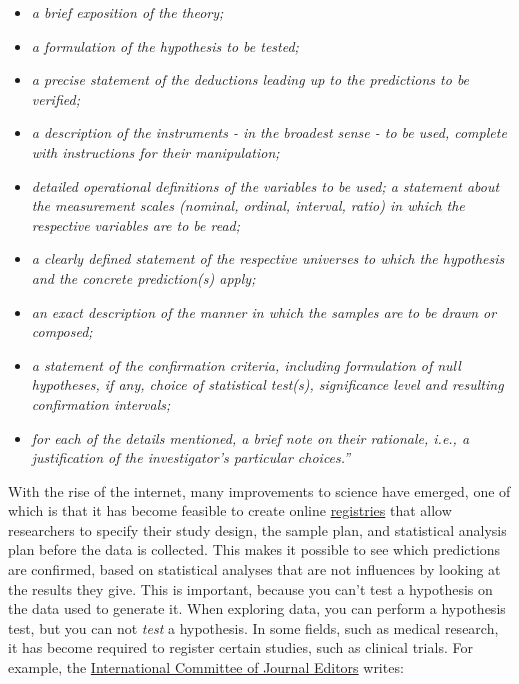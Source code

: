 \documentclass[
  oneside]{book}
\providecommand{\tightlist}{%
  \setlength{\itemsep}{0pt}\setlength{\parskip}{0pt}}
\begin{document}
\begin{itemize}
\tightlist
\item
  \emph{a brief exposition of the theory;}
\item
  \emph{a formulation of the hypothesis to be tested;}
\item
  \emph{a precise statement of the deductions leading up to the predictions to be verified;}
\item
  \emph{a description of the instruments - in the broadest sense - to be used, complete with instructions for their manipulation;}
\item
  \emph{detailed operational definitions of the variables to be used; a statement about the measurement scales (nominal, ordinal, interval, ratio) in which the respective variables are to be read;}
\item
  \emph{a clearly defined statement of the respective universes to which the hypothesis and the concrete prediction(s) apply;}
\item
  \emph{an exact description of the manner in which the samples are to be drawn or composed;}
\item
  \emph{a statement of the confirmation criteria, including formulation of null hypotheses, if any, choice of statistical test(s), significance level and resulting confirmation intervals;}
\item
  \emph{for each of the details mentioned, a brief note on their rationale, i.e., a justification of the investigator's particular choices.''}
\end{itemize}

With the rise of the internet, many improvements to science have emerged, one of which is that it has become feasible to create online \href{https://en.wikipedia.org/wiki/List_of_clinical_trial_registries}{registries} that allow researchers to specify their study design, the sample plan, and statistical analysis plan before the data is collected. This makes it possible to see which predictions are confirmed, based on statistical analyses that are not influences by looking at the results they give. This is important, because you can't test a hypothesis on the data used to generate it. When exploring data, you can perform a hypothesis test, but you can not \emph{test} a hypothesis. In some fields, such as medical research, it has become required to register certain studies, such as clinical trials. For example, the \href{https://www.icmje.org/icmje-recommendations.pdf}{International Committee of Journal Editors} writes:
\end{document}

